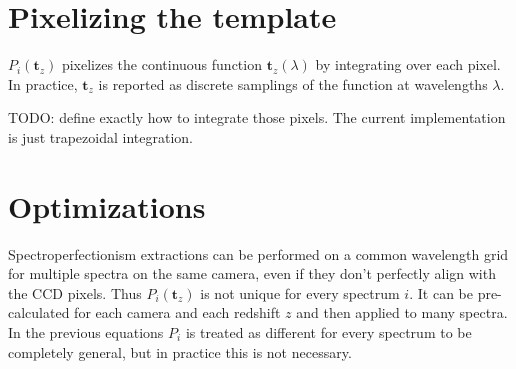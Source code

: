\documentclass[12pt]{article}
\begin{document}
\section{Pixelizing the template}

$P_i(\mathbf{t}_z)$ pixelizes the continuous function $\mathbf{t}_z(\lambda)$
by integrating over each pixel.  In practice, $\mathbf{t}_z$ is reported as
discrete samplings of the function at wavelengths $\lambda$.

TODO: define exactly how to integrate those pixels.
The current implementation is just trapezoidal integration.

\section{Optimizations}

Spectroperfectionism extractions can be performed on a common wavelength
grid for multiple spectra on the same camera, even if they don't perfectly
align with the CCD pixels.  Thus $P_i(\mathbf{t}_z)$ is not unique for every
spectrum $i$.  It can be pre-calculated for each camera and each redshift $z$
and then applied to many spectra.  In the previous equations $P_i$ is treated
as different for every spectrum to be completely general, but in practice
this is not necessary.
\end{document}
